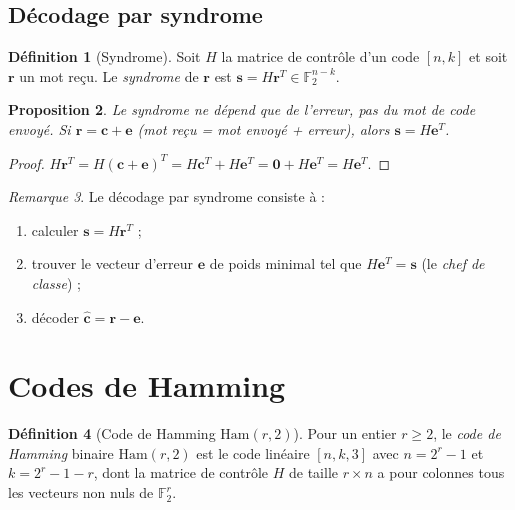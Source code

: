 \documentclass[12pt,a4paper,openany]{book}
\theoremstyle{definition}
\newtheorem{definition}{Définition}[chapter]
\theoremstyle{plain}
\newtheorem{proposition}[definition]{Proposition}
\theoremstyle{remark}
\newtheorem{remarque}[definition]{Remarque}
\begin{document}
\subsection{Décodage par syndrome}
\label{subsec:syndrome}

\begin{definition}[Syndrome]
\label{def:syndrome}
Soit $H$ la matrice de contrôle d'un code $[n,k]$ et soit $\mathbf{r}$
un mot reçu. Le \emph{syndrome} de $\mathbf{r}$ est
$\mathbf{s} = H\mathbf{r}^T \in \mathbb{F}_2^{n-k}$.
\end{definition}

\begin{proposition}
Le syndrome ne dépend que de l'erreur, pas du mot de code envoyé. Si
$\mathbf{r} = \mathbf{c} + \mathbf{e}$ (mot reçu = mot envoyé + erreur),
alors $\mathbf{s} = H\mathbf{e}^T$.
\end{proposition}

\begin{proof}
$H\mathbf{r}^T = H(\mathbf{c}+\mathbf{e})^T = H\mathbf{c}^T +
H\mathbf{e}^T = \mathbf{0} + H\mathbf{e}^T = H\mathbf{e}^T$.
\end{proof}

\begin{remarque}
Le décodage par syndrome consiste à :
\begin{enumerate}
  \item calculer $\mathbf{s} = H\mathbf{r}^T$ ;
  \item trouver le vecteur d'erreur $\mathbf{e}$ de poids minimal tel que
        $H\mathbf{e}^T = \mathbf{s}$ (le \emph{chef de classe}) ;
  \item décoder $\hat{\mathbf{c}} = \mathbf{r} - \mathbf{e}$.
\end{enumerate}
\end{remarque}

\section{Codes de Hamming}
\label{sec:codes-hamming}

\begin{definition}[Code de Hamming $\mathrm{Ham}(r, 2)$]
\label{def:hamming-code}
Pour un entier $r \geq 2$, le \emph{code de Hamming} binaire
$\mathrm{Ham}(r, 2)$ est le code linéaire $[n, k, 3]$ avec $n = 2^r - 1$
et $k = 2^r - 1 - r$, dont la matrice de contrôle $H$ de taille
$r \times n$ a pour colonnes tous les vecteurs non nuls de
$\mathbb{F}_2^r$.
\end{definition}
\end{document}

